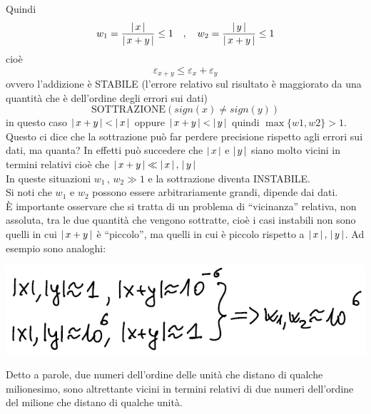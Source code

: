 Quindi
\[w_1 = \frac{\abs*{\,x\,}}{\abs*{\,x + y\,}} \le 1 \quad , \quad w_2 = \frac{\abs*{\,y\,}}{\abs*{\,x + y\,}} \le 1\]
cioè \[\varepsilon_{x+y} \le \varepsilon_x + \varepsilon_y\]
ovvero l'addizione è STABILE (l'errore relativo sul risultato è maggiorato da una quantità che è dell'ordine degli errori sui dati)
\[\text{SOTTRAZIONE} (sign(x) \ne sign(y))\]
in questo caso $\abs{\,x + y\,} < \abs{\,x\,}$ oppure $\abs{\,x + y\,} < \abs{\,y\,}$ quindi $\max \{w1 , w2\} > 1$. \\
Questo ci dice che la sottrazione può far perdere precisione rispetto agli errori sui dati, ma quanta? In effetti può succedere che $\abs{\,x\,}$ e $\abs{\,y\,}$ siano molto vicini in termini relativi cioè che $\abs{\,x + y\,} \ll \abs{\,x\,}\,,\,\abs{\,y\,}$ \\
In queste situazioni $w_1\,,\,w_2 \gg 1$ e la sottrazione diventa INSTABILE.\\
Si noti che $w_1$ e $w_2$ possono essere arbitrariamente grandi, dipende dai dati.\\
È importante osservare che si tratta di un problema di “vicinanza” relativa, non assoluta, tra le due quantità che vengono sottratte, cioè i casi instabili non sono quelli in cui $\abs{\,x + y\,}$ è “piccolo”, ma quelli in cui è piccolo rispetto a $\abs{\,x\,}\,,\,\abs{\,y\,}$.
Ad esempio sono analoghi: 
\begin{center}
    \includegraphics[scale=0.65]{foto/img12}
\end{center}
Detto a parole, due numeri dell'ordine delle unità che distano di qualche milionesimo, sono altrettante vicini in termini relativi di due numeri dell'ordine del milione che distano di qualche unità.

